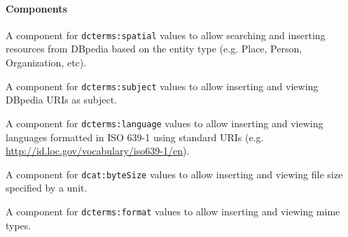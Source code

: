 \documentclass{acm_proc_article-sp}
\begin{document}
\paragraph{Components}
\begin{compactitem}
 \item A component for \texttt{dcterms:spatial} values to allow searching and inserting resources from DBpedia based on the entity type (e.g. Place, Person, Organization, etc).
 \item A component for \texttt{dcterms:subject} values to allow inserting and viewing DBpedia URIs as subject.
 \item A component for \texttt{dcterms:language} values to allow inserting and viewing languages formatted in ISO 639-1 using standard URIs (e.g. \url{http://id.loc.gov/vocabulary/iso639-1/en}).
 \item A component for \texttt{dcat:byteSize} values to allow inserting and viewing file size specified by a unit.
  \item A component for \texttt{dcterms:format} values to allow inserting and viewing mime types.
\end{compactitem}
\end{document}
